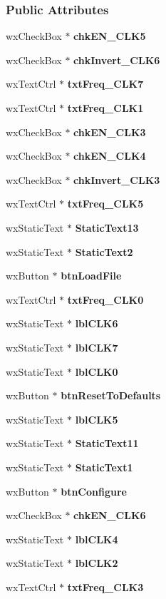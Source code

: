 \subsubsection*{Public Attributes}
\begin{DoxyCompactItemize}
\item 
wx\+Check\+Box $\ast$ {\bf chk\+E\+N\+\_\+\+C\+L\+K5}
\item 
wx\+Check\+Box $\ast$ {\bf chk\+Invert\+\_\+\+C\+L\+K6}
\item 
wx\+Text\+Ctrl $\ast$ {\bf txt\+Freq\+\_\+\+C\+L\+K7}
\item 
wx\+Text\+Ctrl $\ast$ {\bf txt\+Freq\+\_\+\+C\+L\+K1}
\item 
wx\+Check\+Box $\ast$ {\bf chk\+E\+N\+\_\+\+C\+L\+K3}
\item 
wx\+Check\+Box $\ast$ {\bf chk\+E\+N\+\_\+\+C\+L\+K4}
\item 
wx\+Check\+Box $\ast$ {\bf chk\+Invert\+\_\+\+C\+L\+K3}
\item 
wx\+Text\+Ctrl $\ast$ {\bf txt\+Freq\+\_\+\+C\+L\+K5}
\item 
wx\+Static\+Text $\ast$ {\bf Static\+Text13}
\item 
wx\+Static\+Text $\ast$ {\bf Static\+Text2}
\item 
wx\+Button $\ast$ {\bf btn\+Load\+File}
\item 
wx\+Text\+Ctrl $\ast$ {\bf txt\+Freq\+\_\+\+C\+L\+K0}
\item 
wx\+Static\+Text $\ast$ {\bf lbl\+C\+L\+K6}
\item 
wx\+Static\+Text $\ast$ {\bf lbl\+C\+L\+K7}
\item 
wx\+Static\+Text $\ast$ {\bf lbl\+C\+L\+K0}
\item 
wx\+Button $\ast$ {\bf btn\+Reset\+To\+Defaults}
\item 
wx\+Static\+Text $\ast$ {\bf lbl\+C\+L\+K5}
\item 
wx\+Static\+Text $\ast$ {\bf Static\+Text11}
\item 
wx\+Static\+Text $\ast$ {\bf Static\+Text1}
\item 
wx\+Button $\ast$ {\bf btn\+Configure}
\item 
wx\+Check\+Box $\ast$ {\bf chk\+E\+N\+\_\+\+C\+L\+K6}
\item 
wx\+Static\+Text $\ast$ {\bf lbl\+C\+L\+K4}
\item 
wx\+Static\+Text $\ast$ {\bf lbl\+C\+L\+K2}
\item 
wx\+Text\+Ctrl $\ast$ {\bf txt\+Freq\+\_\+\+C\+L\+K3}
\item 

\end{DoxyCompactItemize}
